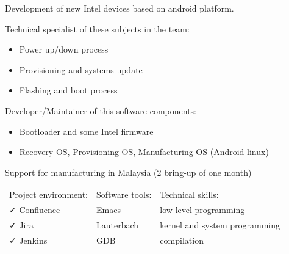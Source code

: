 \documentclass[letterpaper]{jm-cv} %
\begin{document}
\small{

  Development of new Intel devices based on android platform.

  {\footnotesize\color{maingray}\bullet} Technical specialist of these subjects in the team:
  \vspace{-0.2cm}
  \begin{itemize}
  \item[\color{mainblue}\faArrowRight] Power up/down process
  \item[\color{mainblue}\faArrowRight] Provisioning and systems update
  \item[\color{mainblue}\faArrowRight] Flashing and boot process
  \end{itemize}

  {\footnotesize\color{maingray}\bullet}  Developer/Maintainer of this software components:
  \vspace{-0.2cm}
  \begin{itemize}
  \item[\color{mainblue}\faArrowRight] Bootloader and some Intel firmware
  \item[\color{mainblue}\faArrowRight] Recovery OS, Provisioning OS, Manufacturing OS (Android linux)
  \end{itemize}

  {\footnotesize\color{maingray}\bullet} Support for manufacturing in Malaysia (2 bring-up of one month)\\

  \begin{tabular}{ l l l }
    Project environment: & \hspace{1cm}Software tools: & \hspace{1cm}Technical skills:\\
    {\color{mainblue}\faCheck} Confluence &
    \hspace{1cm}{\color{maingreen}\faCheck} Emacs &
    \hspace{1cm}{\color{maingray}\faCheck} low-level programming\\

    {\color{mainblue}\faCheck} Jira &
    \hspace{1cm}{\color{maingreen}\faCheck} Lauterbach &
    \hspace{1cm}{\color{maingray}\faCheck} kernel and system programming\\

    {\color{mainblue}\faCheck} Jenkins &
    \hspace{1cm}{\color{maingreen}\faCheck} GDB &
    \hspace{1cm}{\color{maingray}\faCheck} compilation\\


\end{tabular}}
\end{document}
